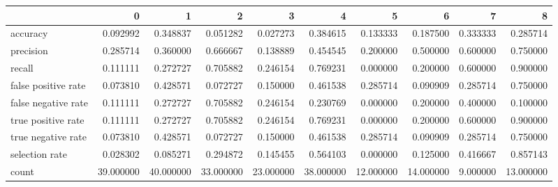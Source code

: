 \begin{tabular}{lrrrrrrrrr}
\toprule
{} &          0 &          1 &          2 &          3 &          4 &          5 &          6 &         7 &          8 \\
\midrule
accuracy            &   0.092992 &   0.348837 &   0.051282 &   0.027273 &   0.384615 &   0.133333 &   0.187500 &  0.333333 &   0.285714 \\
precision           &   0.285714 &   0.360000 &   0.666667 &   0.138889 &   0.454545 &   0.200000 &   0.500000 &  0.600000 &   0.750000 \\
recall              &   0.111111 &   0.272727 &   0.705882 &   0.246154 &   0.769231 &   0.000000 &   0.200000 &  0.600000 &   0.900000 \\
false positive rate &   0.073810 &   0.428571 &   0.072727 &   0.150000 &   0.461538 &   0.285714 &   0.090909 &  0.285714 &   0.750000 \\
false negative rate &   0.111111 &   0.272727 &   0.705882 &   0.246154 &   0.230769 &   0.000000 &   0.200000 &  0.400000 &   0.100000 \\
true positive rate  &   0.111111 &   0.272727 &   0.705882 &   0.246154 &   0.769231 &   0.000000 &   0.200000 &  0.600000 &   0.900000 \\
true negative rate  &   0.073810 &   0.428571 &   0.072727 &   0.150000 &   0.461538 &   0.285714 &   0.090909 &  0.285714 &   0.750000 \\
selection rate      &   0.028302 &   0.085271 &   0.294872 &   0.145455 &   0.564103 &   0.000000 &   0.125000 &  0.416667 &   0.857143 \\
count               &  39.000000 &  40.000000 &  33.000000 &  23.000000 &  38.000000 &  12.000000 &  14.000000 &  9.000000 &  13.000000 \\
\bottomrule
\end{tabular}
